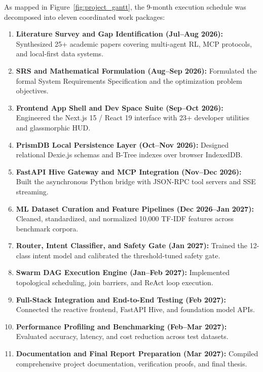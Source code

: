 \documentclass[12pt,a4paper]{report}
\begin{document}
As mapped in Figure~\ref{fig:project_gantt}, the 9-month execution schedule was decomposed into eleven coordinated work packages:
\begin{enumerate}
    \item \textbf{Literature Survey and Gap Identification (Jul--Aug 2026):} Synthesized 25+ academic papers covering multi-agent RL, MCP protocols, and local-first data systems.
    \item \textbf{SRS and Mathematical Formulation (Aug--Sep 2026):} Formulated the formal System Requirements Specification and the optimization problem objectives.
    \item \textbf{Frontend App Shell and Dev Space Suite (Sep--Oct 2026):} Engineered the Next.js 15 / React 19 interface with 23+ developer utilities and glassmorphic HUD.
    \item \textbf{PrismDB Local Persistence Layer (Oct--Nov 2026):} Designed relational Dexie.js schemas and B-Tree indexes over browser IndexedDB.
    \item \textbf{FastAPI Hive Gateway and MCP Integration (Nov--Dec 2026):} Built the asynchronous Python bridge with JSON-RPC tool servers and SSE streaming.
    \item \textbf{ML Dataset Curation and Feature Pipelines (Dec 2026--Jan 2027):} Cleaned, standardized, and normalized 10,000 TF-IDF features across benchmark corpora.
    \item \textbf{Router, Intent Classifier, and Safety Gate (Jan 2027):} Trained the 12-class intent model and calibrated the threshold-tuned safety gate.
    \item \textbf{Swarm DAG Execution Engine (Jan--Feb 2027):} Implemented topological scheduling, join barriers, and ReAct loop execution.
    \item \textbf{Full-Stack Integration and End-to-End Testing (Feb 2027):} Connected the reactive frontend, FastAPI Hive, and foundation model APIs.
    \item \textbf{Performance Profiling and Benchmarking (Feb--Mar 2027):} Evaluated accuracy, latency, and cost reduction across test datasets.
    \item \textbf{Documentation and Final Report Preparation (Mar 2027):} Compiled comprehensive project documentation, verification proofs, and final thesis.
\end{enumerate}


\end{document}
